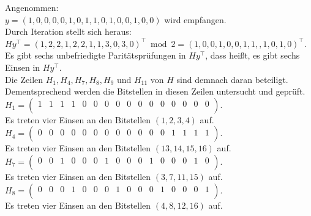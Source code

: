 \begin{Beispiel}
    Angenommen:\\
    $y = (1,0,0,0,0,1,0,1,1,0,1,0,0,1,0,0)$ wird empfangen.\\
    
    Durch Iteration stellt sich heraus:\\
    $Hy^\intercal = (1,2,2,1,2,2,1,1,3,0,3,0)^\intercal \bmod 2 = (1,0,0,1,0,0,1,1,,1,0,1,0)^\intercal$.\\
    
    Es gibt sechs unbefriedigte Paritätsprüfungen in $Hy^\intercal$, dass hei\ss{}t, es gibt sechs Einsen in $Hy^\intercal.$\\
    Die Zeilen $H_1, H_4, H_7, H_8, H_9$ und $H_{11}$ von $H$ sind demnach daran beteiligt.\\
    Dementsprechend werden die Bitstellen in diesen Zeilen untersucht und geprüft.\\
    
    $H_1= \left( \begin{array}{rrrrrrrrrrrrrrrr}
        1 & 1 & 1 & 1 & 0 & 0 & 0 & 0 & 0 & 0 & 0 & 0 & 0 & 0 & 0 & 0 \\
       \end{array}\right). 
    $\\
    Es treten vier Einsen an den Bitstellen $(1, 2, 3, 4)$ auf.\\
    
    $H_4= \left( \begin{array}{rrrrrrrrrrrrrrrr}
        0 & 0 & 0 & 0 & 0 & 0 & 0 & 0 & 0 & 0 & 0 & 0 & 1 & 1 & 1 & 1 \\
       \end{array}\right). 
    $\\
    Es treten vier Einsen an den Bitstellen $(13, 14, 15, 16)$ auf.\\
    
    $H_7= \left( \begin{array}{rrrrrrrrrrrrrrrr}
        0 & 0 & 1 & 0 & 0 & 0 & 1 & 0 & 0 & 0 & 1 & 0 & 0 & 0 & 1 & 0 \\
       \end{array}\right). 
    $\\
    Es treten vier Einsen an den Bitstellen $(3, 7, 11, 15)$ auf.\\
    
    $H_8= \left( \begin{array}{rrrrrrrrrrrrrrrr}
        0 & 0 & 0 & 1 & 0 & 0 & 0 & 1 & 0 & 0 & 0 & 1 & 0 & 0 & 0 & 1 \\
       \end{array}\right). 
    $\\
    Es treten vier Einsen an den Bitstellen $(4, 8, 12, 16)$ auf.\\
    

\end{Beispiel}
